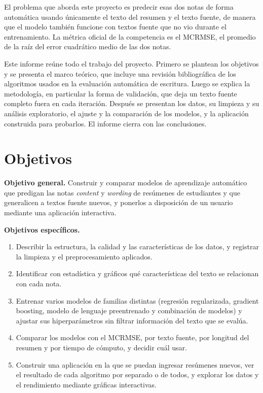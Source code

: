 \documentclass[11pt,a4paper]{article}
\begin{document}
El problema que aborda este proyecto es predecir esas dos notas de forma automática usando únicamente el texto del resumen y el texto fuente, de manera que el modelo también funcione con textos fuente que no vio durante el entrenamiento. La métrica oficial de la competencia es el MCRMSE, el promedio de la raíz del error cuadrático medio de las dos notas.

Este informe reúne todo el trabajo del proyecto. Primero se plantean los objetivos y se presenta el marco teórico, que incluye una revisión bibliográfica de los algoritmos usados en la evaluación automática de escritura. Luego se explica la metodología, en particular la forma de validación, que deja un texto fuente completo fuera en cada iteración. Después se presentan los datos, su limpieza y su análisis exploratorio, el ajuste y la comparación de los modelos, y la aplicación construida para probarlos. El informe cierra con las conclusiones.

\section{Objetivos}

\textbf{Objetivo general.} Construir y comparar modelos de aprendizaje automático que predigan las notas \emph{content} y \emph{wording} de resúmenes de estudiantes y que generalicen a textos fuente nuevos, y ponerlos a disposición de un usuario mediante una aplicación interactiva.

\textbf{Objetivos específicos.}
\begin{enumerate}[nosep]
\item Describir la estructura, la calidad y las características de los datos, y registrar la limpieza y el preprocesamiento aplicados.
\item Identificar con estadística y gráficos qué características del texto se relacionan con cada nota.
\item Entrenar varios modelos de familias distintas (regresión regularizada, gradient boosting, modelo de lenguaje preentrenado y combinación de modelos) y ajustar sus hiperparámetros sin filtrar información del texto que se evalúa.
\item Comparar los modelos con el MCRMSE, por texto fuente, por longitud del resumen y por tiempo de cómputo, y decidir cuál usar.
\item Construir una aplicación en la que se puedan ingresar resúmenes nuevos, ver el resultado de cada algoritmo por separado o de todos, y explorar los datos y el rendimiento mediante gráficas interactivas.
\end{enumerate}
\end{document}
